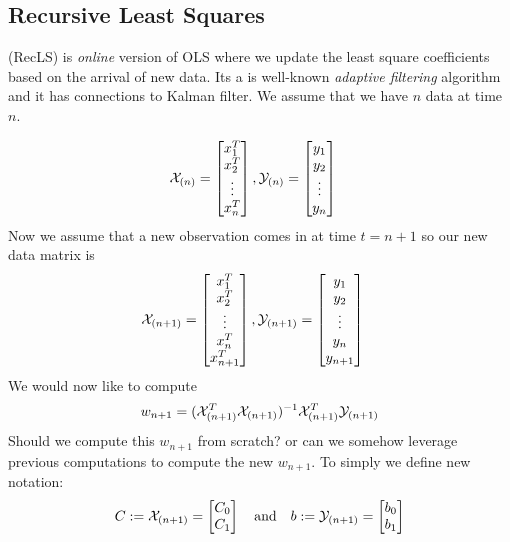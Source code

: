 \subsection{Recursive Least Squares}
 (RecLS) is \textit{online} version of OLS where we update the least square coefficients based on the arrival of new data. Its a is well-known \textit{adaptive filtering} algorithm and it has connections to Kalman filter. We assume that we have $n$ data at time $n$.

 \begin{align}
    \mathcal X_{(n)} &= \begin{bmatrix}
           x_{1}^T \\
           x_{2}^T \\
           \vdots \\
           x_{n}^T
         \end{bmatrix}, 
    \mathcal Y_{(n)} = \begin{bmatrix}
           y_{1} \\
           y_{2} \\
           \vdots \\
           y_{n}
         \end{bmatrix}
  \end{align}
Now we assume that a new observation comes in at time $t = n+1$ so our new data matrix is 
\begin{align}
    \mathcal X_{(n+1)} &= \begin{bmatrix}
           x_{1}^T \\
           x_{2}^T \\
           \vdots \\
           x_{n}^T \\
           x_{n+1}^T
         \end{bmatrix}, 
    \mathcal Y_{(n+1)} = \begin{bmatrix}
           y_{1} \\
           y_{2} \\
           \vdots \\
           y_{n} \\
           y_{n+1}
         \end{bmatrix}
  \end{align}
We would now like to compute 
$$
w_{n+1} = (\mathcal X_{(n+1)}^T \mathcal X_{(n+1)})^{-1} \mathcal X_{(n+1)}^T \mathcal Y_{(n+1)}
$$
Should we compute this $w_{n+1}$ from scratch? or can we somehow leverage
previous computations to compute the new $w_{n+1}$.
To simply we define new notation:
$$
C : =  \mathcal X_{(n+1)} = \begin{bmatrix}
           C_{0} \\
           C_{1}
         \end{bmatrix}
         \quad \text{and} \quad 
         b := \mathcal Y_{(n+1)} = \begin{bmatrix}
           b_{0} \\
           b_{1}
         \end{bmatrix}
$$
